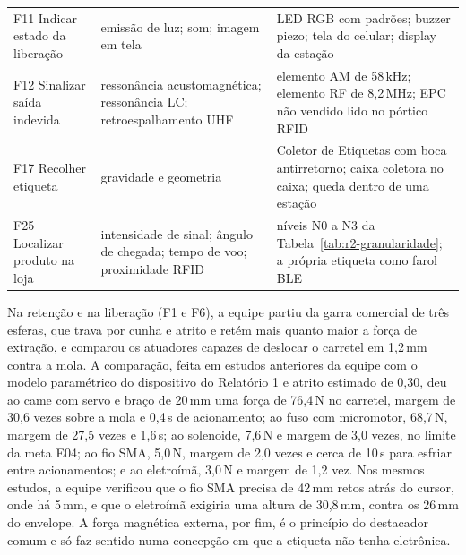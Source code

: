 \begin{table}[htbp]
\begin{tabularx}{\textwidth}{@{}
        >{\RaggedRight\arraybackslash}p{3.3cm}
        >{\RaggedRight\arraybackslash}p{4.6cm}
        >{\RaggedRight\arraybackslash}X@{}}
        \addlinespace
        F11 Indicar estado da liberação & emissão de luz; som; imagem em tela & LED RGB com padrões; buzzer piezo; tela do celular; display da estação \\
        \addlinespace
        F12 Sinalizar saída indevida & ressonância acustomagnética; ressonância LC; retroespalhamento UHF & elemento AM de 58\,kHz; elemento RF de 8,2\,MHz; EPC não vendido lido no pórtico RFID \\
        \addlinespace
        F17 Recolher etiqueta & gravidade e geometria & Coletor de Etiquetas com boca antirretorno; caixa coletora no caixa; queda dentro de uma estação \\
        \addlinespace
        F25 Localizar produto na loja & intensidade de sinal; ângulo de chegada; tempo de voo; proximidade RFID & níveis N0 a N3 da Tabela~\ref{tab:r2-granularidade}; a própria etiqueta como farol BLE \\
        \bottomrule
    \end{tabularx}
\end{table}

Na retenção e na liberação (F1 e F6), a equipe partiu da garra comercial de três esferas, que trava por cunha e atrito e retém mais quanto maior a força de extração, e comparou os atuadores capazes de deslocar o carretel em 1,2\,mm contra a mola. A comparação, feita em estudos anteriores da equipe com o modelo paramétrico do dispositivo do Relatório 1 e atrito estimado de 0,30, deu ao came com servo e braço de 20\,mm uma força de 76,4\,N no carretel, margem de 30,6 vezes sobre a mola e 0,4\,s de acionamento; ao fuso com micromotor, 68,7\,N, margem de 27,5 vezes e 1,6\,s; ao solenoide, 7,6\,N e margem de 3,0 vezes, no limite da meta E04; ao fio SMA, 5,0\,N, margem de 2,0 vezes e cerca de 10\,s para esfriar entre acionamentos; e ao eletroímã, 3,0\,N e margem de 1,2 vez. Nos mesmos estudos, a equipe verificou que o fio SMA precisa de 42\,mm retos atrás do cursor, onde há 5\,mm, e que o eletroímã exigiria uma altura de 30,8\,mm, contra os 26\,mm do envelope. A força magnética externa, por fim, é o princípio do destacador comum e só faz sentido numa concepção em que a etiqueta não tenha eletrônica.

